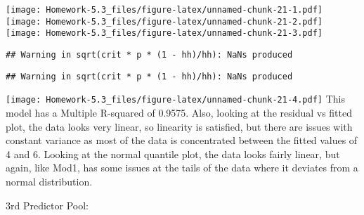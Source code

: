 \documentclass[
]{article}
\begin{document}
\texttt{[image: Homework-5.3\_files/figure-latex/unnamed-chunk-21-1.pdf]}
\texttt{[image: Homework-5.3\_files/figure-latex/unnamed-chunk-21-2.pdf]}
\texttt{[image: Homework-5.3\_files/figure-latex/unnamed-chunk-21-3.pdf]}

\begin{verbatim}
## Warning in sqrt(crit * p * (1 - hh)/hh): NaNs produced
\end{verbatim}

\begin{verbatim}
## Warning in sqrt(crit * p * (1 - hh)/hh): NaNs produced
\end{verbatim}

\texttt{[image: Homework-5.3\_files/figure-latex/unnamed-chunk-21-4.pdf]}
This model has a Multiple R-squared of 0.9575. Also, looking at the
residual vs fitted plot, the data looks very linear, so linearity is
satisfied, but there are issues with constant variance as most of the
data is concentrated between the fitted values of 4 and 6. Looking at
the normal quantile plot, the data looks fairly linear, but again, like
Mod1, has some issues at the tails of the data where it deviates from a
normal distribution.

3rd Predictor Pool:
\end{document}
